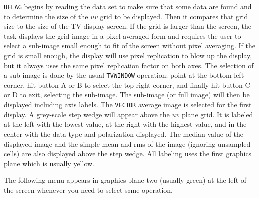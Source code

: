 \documentclass[twoside]{article}
\begin{document}
{\tt UFLAG} begins by reading the data set to make sure that some data
are found and to determine the size of the $uv$ grid to be displayed.
Then it compares that grid size to the size of the TV display screen.
If the grid is larger than the screen, the task displays the grid
image in a pixel-averaged form and requires the user to select a
sub-image small enough to fit of the screen without pixel averaging.
If the grid is small enough, the display will use pixel replication to
blow up the display, but it always uses the same pixel replication
factor on both axes.  The selection of a sub-image is done by the
usual {\tt TVWINDOW} operation: point at the bottom left corner, hit
button A or B to select the top right corner, and finally hit button C
or D to exit, selecting the sub-image.  The sub-image (or full image)
will then be displayed including axis labels.  The {\tt VECTOR}
average image is selected for the first display.  A grey-scale step
wedge will appear above the $uv$ plane grid.  It is labeled at the
left with the lowest value, at the right with the highest value, and
in the center with the data type and polarization displayed.  The
median value of the displayed image and the simple mean and rms of the
image (ignoring unsampled cells) are also displayed above the step
wedge.  All labeling uses the first graphics plane which is usually
yellow.

The following menu appears in graphics plane two (usually green) at
the left of the screen whenever you need to select some operation.
\end{document}
